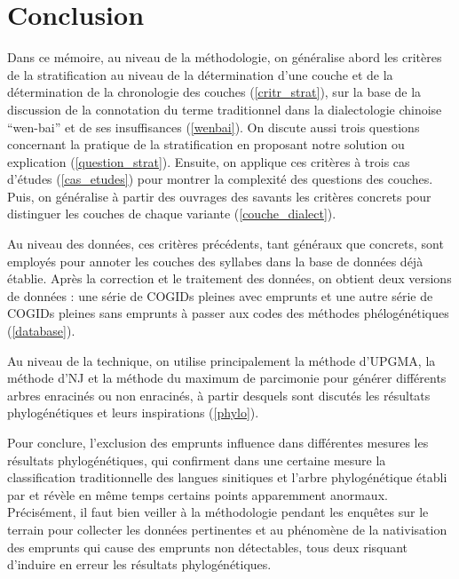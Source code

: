 \documentclass{scrbook}
\newcounter{c}[subsubsection]
\begin{document}
\begin{sloppypar}
\chapter{Conclusion}
Dans ce mémoire, au niveau de la méthodologie, on généralise abord les critères de la stratification au niveau de la détermination d'une couche et de la détermination de la chronologie des couches (\ref{critr_strat}), sur la base de la discussion de la connotation du terme traditionnel dans la dialectologie chinoise ``wen-bai'' et de ses insuffisances (\ref{wenbai}). On discute aussi trois questions concernant la pratique de la stratification en proposant notre solution ou explication (\ref{question_strat}). Ensuite, on applique ces critères à trois cas d'études (\ref{cas_etudes}) pour montrer la complexité des questions des couches. Puis, on généralise à partir des ouvrages des savants les critères concrets pour distinguer les couches de chaque variante (\ref{couche_dialect}). 

Au niveau des données, ces critères précédents, tant généraux que concrets, sont employés pour annoter les couches des syllabes dans la base de données déjà établie. Après la correction et le traitement des données, on obtient deux versions de données : une série de COGIDs pleines avec emprunts et une autre série de COGIDs pleines sans emprunts à passer aux codes des méthodes phélogénétiques (\ref{database}). 

Au niveau de la technique, on utilise principalement la méthode d'UPGMA, la méthode d'NJ et la méthode du maximum de parcimonie pour générer différents arbres enracinés ou non enracinés, à partir desquels sont discutés les résultats phylogénétiques et leurs inspirations (\ref{phylo}). 

Pour conclure, l'exclusion des emprunts influence dans différentes mesures les résultats phylogénétiques, qui confirment dans une certaine mesure la classification traditionnelle des langues sinitiques et l'arbre phylogénétique établi par \textcite{sagart2011classifying} et révèle en même temps certains points apparemment anormaux. Précisément, il faut bien veiller à la méthodologie pendant les enquêtes sur le terrain pour collecter les données pertinentes et au phénomène de la nativisation des emprunts qui cause des emprunts non détectables, tous deux risquant d'induire en erreur les résultats phylogénétiques. 


\end{sloppypar}
\end{document}
